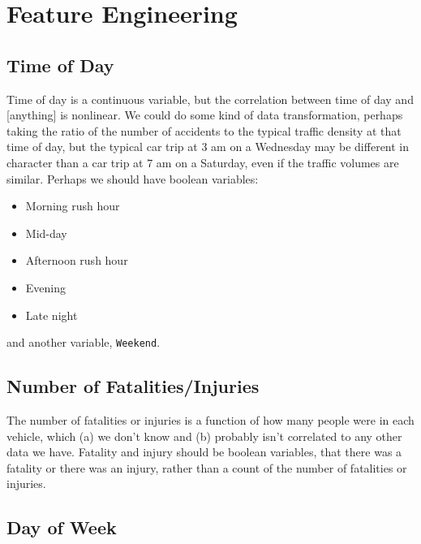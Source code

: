 \section{Feature Engineering}

\subsection{Time of Day}

Time of day is a continuous variable, but the correlation between time of day and [anything] is nonlinear.  We could do some kind of data transformation, perhaps taking the ratio of the number of accidents to the typical traffic density at that time of day, but the typical car trip at 3 am on a Wednesday may be different in character than a car trip at 7 am on a Saturday, even if the traffic volumes are similar.  Perhaps we should have boolean variables:

\begin{itemize}
	\item Morning rush hour
	\item Mid-day
	\item Afternoon rush hour
	\item Evening
	\item Late night
\end{itemize}

and another variable, {\tt Weekend}.

\subsection{Number of Fatalities/Injuries}

The number of fatalities or injuries is a function of how many people were in each vehicle, which (a) we don't know and (b) probably isn't correlated to any other data we have.  Fatality and injury should be  boolean variables, that there was a fatality or there was an injury, rather than a count of the number of fatalities or injuries.  

\subsection{Day of Week}


